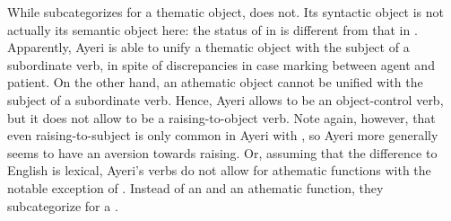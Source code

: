 While  subcategorizes for a thematic object,  does not.
Its syntactic object is not actually its semantic object here: the status of
 in  is different from that in
. Apparently, Ayeri is able to unify a
thematic object with the subject of a subordinate verb, in spite of
discrepancies in case marking between agent and patient. On the other hand, an
athematic object cannot be unified with the subject of a subordinate verb.
Hence, Ayeri allows  to be an object-control verb, but
it does not allow  to be a raising-to-object
verb. Note again, however, that even raising-to-subject is only common in Ayeri
with , so Ayeri more generally seems to have an
aversion towards raising. Or, assuming that the difference to English is
lexical, Ayeri's verbs do not allow for athematic functions with the notable
exception of . Instead of an \XCompl{} and an athematic
function, they subcategorize for a \Compl{}.

